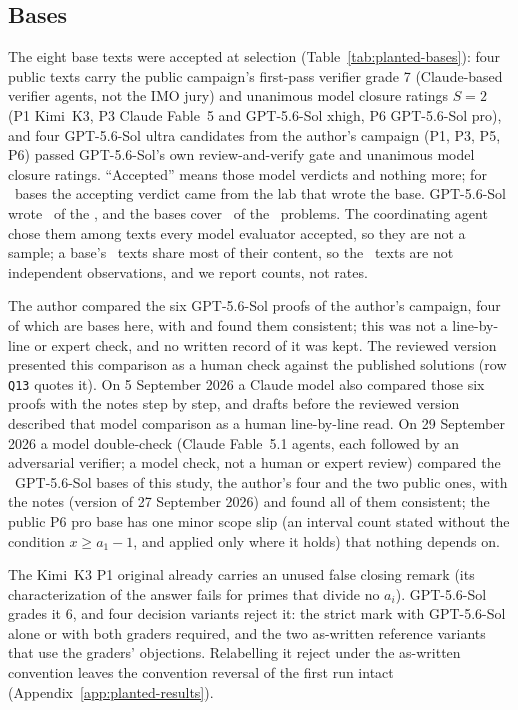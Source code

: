 \subsection{Bases}
\label{app:planted-bases}
The eight base texts were accepted at selection (Table~\ref{tab:planted-bases}): four public texts carry the public campaign's first-pass verifier grade 7 (Claude-based verifier agents, not the IMO jury) and unanimous model closure ratings $S{=}2$ (P1 Kimi~K3, P3 Claude Fable~5 and GPT-5.6-Sol xhigh, P6 GPT-5.6-Sol pro), and four GPT-5.6-Sol ultra candidates from the author's campaign (P1, P3, P5, P6) passed GPT-5.6-Sol's own review-and-verify gate and unanimous model closure ratings. ``Accepted'' means those model verdicts and nothing more; for \CRBasesSameLabWord\ bases the accepting verdict came from the lab that wrote the base. GPT-5.6-Sol wrote \CRBasesGPTWord\ of the \CRNBasesWord, and the bases cover \CRNProblemsCoveredWord\ of the \CRNProblems\ problems. The coordinating agent chose them among texts every model evaluator accepted, so they are not a sample; a base's \CRTextsPerBaseWord\ texts share most of their content, so the \CRNTexts\ texts are not independent observations, and we report counts, not rates.

The author compared the six GPT-5.6-Sol proofs of the author's campaign, four of which are bases here, with \citet{chen2026notes} and found them consistent; this was not a line-by-line or expert check, and no written record of it was kept. The reviewed version presented this comparison as a human check against the published solutions (row \texttt{Q13} quotes it). On 5 September 2026 a Claude model also compared those six proofs with the notes step by step, and drafts before the reviewed version described that model comparison as a human line-by-line read. On 29 September 2026 a model double-check (Claude Fable~5.1 agents, each followed by an adversarial verifier; a model check, not a human or expert review) compared the \CRBasesGPTWord\ GPT-5.6-Sol bases of this study, the author's four and the two public ones, with the notes (version of 27 September 2026) and found all of them consistent; the public P6 pro base has one minor scope slip (an interval count stated without the condition $x \ge a_1 - 1$, and applied only where it holds) that nothing depends on.

The Kimi~K3 P1 original already carries an unused false closing remark (its characterization of the answer fails for primes that divide no $a_i$). GPT-5.6-Sol grades it 6, and four decision variants reject it: the strict mark with GPT-5.6-Sol alone or with both graders required, and the two as-written reference variants that use the graders' objections. Relabelling it reject under the as-written convention leaves the convention reversal of the first run intact (Appendix~\ref{app:planted-results}).

